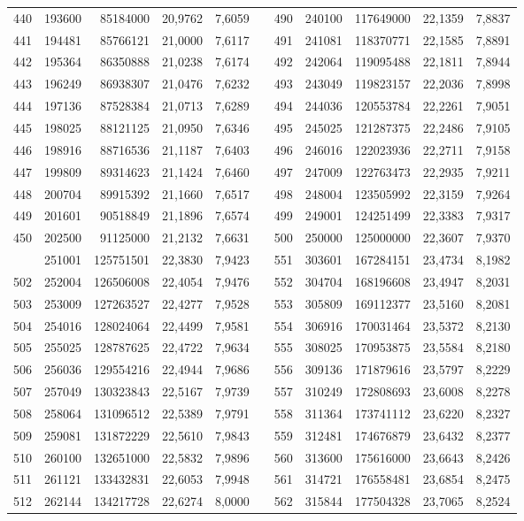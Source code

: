 \begin{longtable}{rrrrrrrrrrr}
440&193600&85184000&20,9762&7,6059&&490&240100&117649000&22,1359&7,8837\\
441&194481&85766121&21,0000&7,6117&&491&241081&118370771&22,1585&7,8891\\
442&195364&86350888&21,0238&7,6174&&492&242064&119095488&22,1811&7,8944\\
443&196249&86938307&21,0476&7,6232&&493&243049&119823157&22,2036&7,8998\\
444&197136&87528384&21,0713&7,6289&&494&244036&120553784&22,2261&7,9051\\
445&198025&88121125&21,0950&7,6346&&495&245025&121287375&22,2486&7,9105\\
446&198916&88716536&21,1187&7,6403&&496&246016&122023936&22,2711&7,9158\\
447&199809&89314623&21,1424&7,6460&&497&247009&122763473&22,2935&7,9211\\
448&200704&89915392&21,1660&7,6517&&498&248004&123505992&22,3159&7,9264\\
449&201601&90518849&21,1896&7,6574&&499&249001&124251499&22,3383&7,9317\\
450&202500&91125000&21,2132&7,6631&&500&250000&125000000&22,3607&7,9370\\
\newpage
501&251001&125751501&22,3830&7,9423&&551&303601&167284151&23,4734&8,1982\\
502&252004&126506008&22,4054&7,9476&&552&304704&168196608&23,4947&8,2031\\
503&253009&127263527&22,4277&7,9528&&553&305809&169112377&23,5160&8,2081\\
504&254016&128024064&22,4499&7,9581&&554&306916&170031464&23,5372&8,2130\\
505&255025&128787625&22,4722&7,9634&&555&308025&170953875&23,5584&8,2180\\
506&256036&129554216&22,4944&7,9686&&556&309136&171879616&23,5797&8,2229\\
507&257049&130323843&22,5167&7,9739&&557&310249&172808693&23,6008&8,2278\\
508&258064&131096512&22,5389&7,9791&&558&311364&173741112&23,6220&8,2327\\
509&259081&131872229&22,5610&7,9843&&559&312481&174676879&23,6432&8,2377\\
510&260100&132651000&22,5832&7,9896&&560&313600&175616000&23,6643&8,2426\\
511&261121&133432831&22,6053&7,9948&&561&314721&176558481&23,6854&8,2475\\
512&262144&134217728&22,6274&8,0000&&562&315844&177504328&23,7065&8,2524\\

\end{longtable}
